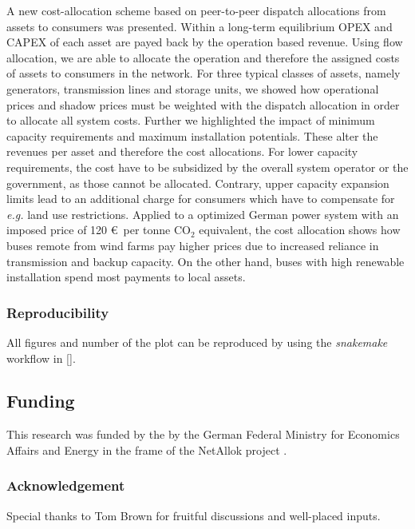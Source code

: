 \documentclass[11pt,twocolumn]{article}
\newcommand{\eg}{\textit{e.g.} }
\begin{document}
A new cost-allocation scheme based on peer-to-peer dispatch allocations from assets to consumers was presented. Within a long-term equilibrium OPEX and CAPEX of each asset are payed back by the operation based revenue. Using flow allocation, we are able to allocate the operation and therefore the assigned costs of assets to consumers in the network. For three typical classes of assets, namely generators, transmission lines and storage units, we showed how operational prices and shadow prices must be weighted with the dispatch allocation in order to allocate all system costs. Further we highlighted the impact of minimum capacity requirements and maximum installation potentials. These alter the revenues per asset and therefore the cost allocations. For lower capacity requirements, the cost have to be subsidized by the overall system operator or the government, as those cannot be allocated. Contrary, upper capacity expansion limits lead to an additional charge for consumers which have to compensate for \eg land use restrictions.  
Applied to a optimized German power system with an imposed price of 120 \euro\, per tonne CO$_2$ equivalent, the cost allocation shows how buses remote from wind farms pay higher prices due to increased reliance in transmission and backup capacity. On the other hand, buses with high renewable installation spend most payments to local assets. 


\subsubsection*{Reproducibility}

All figures and number of the plot can be reproduced by using the \textit{snakemake} workflow in [].

\subsection*{Funding}
This research was funded by the by the German Federal Ministry for Economics Affairs and Energy in
the frame of the NetAllok project \cite{bundesministerium_fur_wirtschaft_und_energie_verbundvorhaben_nodate}.

\subsubsection*{Acknowledgement}

Special thanks to Tom Brown for fruitful discussions and well-placed inputs.  
\end{document}

